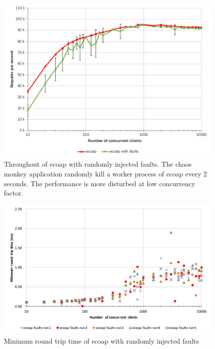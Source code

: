 \begin{figure}[!htbp]
\centering
\includegraphics[scale = 0.8]{throughput_with_faults}
\caption[Throughout of ecoap with randomly injected faults]{Throughout of ecoap with randomly injected faults. The chaos monkey application randomly kill a worker process of ecoap every 2 seconds. The performance is more disturbed at low concurrency factor.}
\label{fig:throughput_with_faults}
\end{figure}

\begin{figure}[!htbp]
\centering
\includegraphics[scale = 0.8]{ecoap_min_round_trip_time_faults}
\caption{Minimum round trip time of ecoap with randomly injected faults}
\label{fig:ecoap_min_round_trip_time_faults}
\end{figure}

